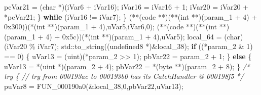 \documentclass[
]{article}
\newenvironment{Shaded}{}{}
\newcommand{\BaseNTok}[1]{\textcolor[rgb]{0.25,0.63,0.44}{#1}}
\newcommand{\CommentTok}[1]{\textcolor[rgb]{0.38,0.63,0.69}{\textit{#1}}}
\newcommand{\ControlFlowTok}[1]{\textcolor[rgb]{0.00,0.44,0.13}{\textbf{#1}}}
\newcommand{\DataTypeTok}[1]{\textcolor[rgb]{0.56,0.13,0.00}{#1}}
\newcommand{\DecValTok}[1]{\textcolor[rgb]{0.25,0.63,0.44}{#1}}
\newcommand{\NormalTok}[1]{#1}
\newcommand{\OperatorTok}[1]{\textcolor[rgb]{0.40,0.40,0.40}{#1}}
\begin{document}
\begin{Shaded}
\begin{Highlighting}[]
\NormalTok{      pcVar21 }\OperatorTok{=} \OperatorTok{(}\DataTypeTok{char} \OperatorTok{*)(}\NormalTok{iVar6 }\OperatorTok{+}\NormalTok{ iVar16}\OperatorTok{);}
\NormalTok{      iVar16 }\OperatorTok{=}\NormalTok{ iVar16 }\OperatorTok{+} \DecValTok{1}\OperatorTok{;}
\NormalTok{      iVar20 }\OperatorTok{=}\NormalTok{ iVar20 }\OperatorTok{+} \OperatorTok{*}\NormalTok{pcVar21}\OperatorTok{;}
    \OperatorTok{\}} \ControlFlowTok{while} \OperatorTok{(}\NormalTok{iVar16 }\OperatorTok{!=}\NormalTok{ iVar7}\OperatorTok{);}
  \OperatorTok{\}}
  \OperatorTok{(**(}\NormalTok{code }\OperatorTok{**)(**(}\DataTypeTok{int} \OperatorTok{**)(}\NormalTok{param\_1 }\OperatorTok{+} \DecValTok{4}\OperatorTok{)} \OperatorTok{+} \BaseNTok{0x300}\OperatorTok{))(*(}\DataTypeTok{int} \OperatorTok{**)(}\NormalTok{param\_1 }\OperatorTok{+} \DecValTok{4}\OperatorTok{),}\NormalTok{uVar5}\OperatorTok{,}\NormalTok{iVar6}\OperatorTok{,}\DecValTok{0}\OperatorTok{);}
  \OperatorTok{(**(}\NormalTok{code }\OperatorTok{**)(**(}\DataTypeTok{int} \OperatorTok{**)(}\NormalTok{param\_1 }\OperatorTok{+} \DecValTok{4}\OperatorTok{)} \OperatorTok{+} \BaseNTok{0x5c}\OperatorTok{))(*(}\DataTypeTok{int} \OperatorTok{**)(}\NormalTok{param\_1 }\OperatorTok{+} \DecValTok{4}\OperatorTok{),}\NormalTok{uVar5}\OperatorTok{);}
\NormalTok{  local\_64 }\OperatorTok{=} \OperatorTok{(}\DataTypeTok{char}\OperatorTok{)(}\NormalTok{iVar20 }\OperatorTok{\%}\NormalTok{ iVar7}\OperatorTok{);}
\NormalTok{  std}\OperatorTok{::}\NormalTok{to\_string}\OperatorTok{((}\NormalTok{undefined8 }\OperatorTok{*)\&}\NormalTok{local\_38}\OperatorTok{);}
  \ControlFlowTok{if} \OperatorTok{((*}\NormalTok{param\_2 }\OperatorTok{\&} \DecValTok{1}\OperatorTok{)} \OperatorTok{==} \DecValTok{0}\OperatorTok{)} \OperatorTok{\{}
\NormalTok{    uVar13 }\OperatorTok{=} \OperatorTok{(}\NormalTok{uint}\OperatorTok{)(*}\NormalTok{param\_2 }\OperatorTok{\textgreater{}\textgreater{}} \DecValTok{1}\OperatorTok{);}
\NormalTok{    pbVar22 }\OperatorTok{=}\NormalTok{ param\_2 }\OperatorTok{+} \DecValTok{1}\OperatorTok{;}
  \OperatorTok{\}}
  \ControlFlowTok{else} \OperatorTok{\{}
\NormalTok{    uVar13 }\OperatorTok{=} \OperatorTok{*(}\NormalTok{uint }\OperatorTok{*)(}\NormalTok{param\_2 }\OperatorTok{+} \DecValTok{4}\OperatorTok{);}
\NormalTok{    pbVar22 }\OperatorTok{=} \OperatorTok{*(}\NormalTok{byte }\OperatorTok{**)(}\NormalTok{param\_2 }\OperatorTok{+} \DecValTok{8}\OperatorTok{);}
  \OperatorTok{\}}
                    \CommentTok{/* try \{ // try from 000193ac to 000193b0 has its CatchHandler @ 000198f5 */}
\NormalTok{  puVar8 }\OperatorTok{=}\NormalTok{ FUN\_000190a0}\OperatorTok{(\&}\NormalTok{local\_38}\OperatorTok{,}\DecValTok{0}\OperatorTok{,}\NormalTok{pbVar22}\OperatorTok{,}\NormalTok{uVar13}\OperatorTok{);}

\end{Highlighting}
\end{Shaded}
\end{document}

